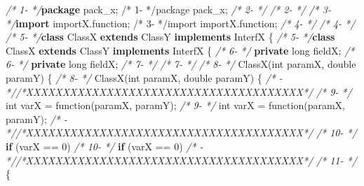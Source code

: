 \documentclass[
]{article}
\newenvironment{Shaded}{\begin{snugshade}}{\end{snugshade}}
\newcommand{\CommentTok}[1]{\textcolor[rgb]{0.56,0.35,0.01}{\textit{#1}}}
\newcommand{\DataTypeTok}[1]{\textcolor[rgb]{0.13,0.29,0.53}{#1}}
\newcommand{\DecValTok}[1]{\textcolor[rgb]{0.00,0.00,0.81}{#1}}
\newcommand{\FunctionTok}[1]{\textcolor[rgb]{0.00,0.00,0.00}{#1}}
\newcommand{\ImportTok}[1]{#1}
\newcommand{\KeywordTok}[1]{\textcolor[rgb]{0.13,0.29,0.53}{\textbf{#1}}}
\newcommand{\NormalTok}[1]{#1}
\begin{document}
\begin{Shaded}
\begin{Highlighting}[]
\CommentTok{/*  1-   */}\KeywordTok{package}\ImportTok{ pack_x;                                          /*  1-   */package pack_x;}                                          
\CommentTok{/*  2-   */}                                                         \CommentTok{/*  2-   */}                                                         
\CommentTok{/*  3-   */}\KeywordTok{import}\ImportTok{ importX.function;                                 /*  3-   */import importX.function;}                                 
\CommentTok{/*  4-   */}                                                         \CommentTok{/*  4-   */}                                                         
\CommentTok{/*  5-   */}\KeywordTok{class}\NormalTok{ ClassX }\KeywordTok{extends}\NormalTok{ ClassY }\KeywordTok{implements}\NormalTok{ InterfX \{         }\CommentTok{/*  5-   */}\KeywordTok{class}\NormalTok{ ClassX }\KeywordTok{extends}\NormalTok{ ClassY }\KeywordTok{implements}\NormalTok{ InterfX \{         }
\CommentTok{/*  6-   */}    \KeywordTok{private} \DataTypeTok{long}\NormalTok{ fieldX;                                 }\CommentTok{/*  6-   */}    \KeywordTok{private} \DataTypeTok{long}\NormalTok{ fieldX;                                 }
\CommentTok{/*  7-   */}                                                         \CommentTok{/*  7-   */}                                                         
\CommentTok{/*  8-   */}    \FunctionTok{ClassX}\NormalTok{(}\DataTypeTok{int}\NormalTok{ paramX, }\DataTypeTok{double}\NormalTok{ paramY) \{                  }\CommentTok{/*  8-   */}    \FunctionTok{ClassX}\NormalTok{(}\DataTypeTok{int}\NormalTok{ paramX, }\DataTypeTok{double}\NormalTok{ paramY) \{                  }
\CommentTok{/*   -   *//*XXXXXXXXXXXXXXXXXXXXXXXXXXXXXXXXXXXXXX*/}               \CommentTok{/*  9-   */}        \DataTypeTok{int}\NormalTok{ varX = }\FunctionTok{function}\NormalTok{(paramX, paramY);                  }
\CommentTok{/*  9-   */}        \DataTypeTok{int}\NormalTok{ varX = }\FunctionTok{function}\NormalTok{(paramX, paramY);             }\CommentTok{/*   -   *//*XXXXXXXXXXXXXXXXXXXXXXXXXXXXXXXXXXXXXX*/}               
\CommentTok{/* 10-   */}        \KeywordTok{if}\NormalTok{ (varX == }\DecValTok{0}\NormalTok{)                                   }\CommentTok{/* 10-   */}        \KeywordTok{if}\NormalTok{ (varX == }\DecValTok{0}\NormalTok{)                                   }
\CommentTok{/*   -   *//*XXXXXXXXXXXXXXXXXXXXXXXXXXXXXXXXXXXXXX*/}               \CommentTok{/* 11-   */}\NormalTok{        \{                                                }

\end{Highlighting}
\end{Shaded}
\end{document}
